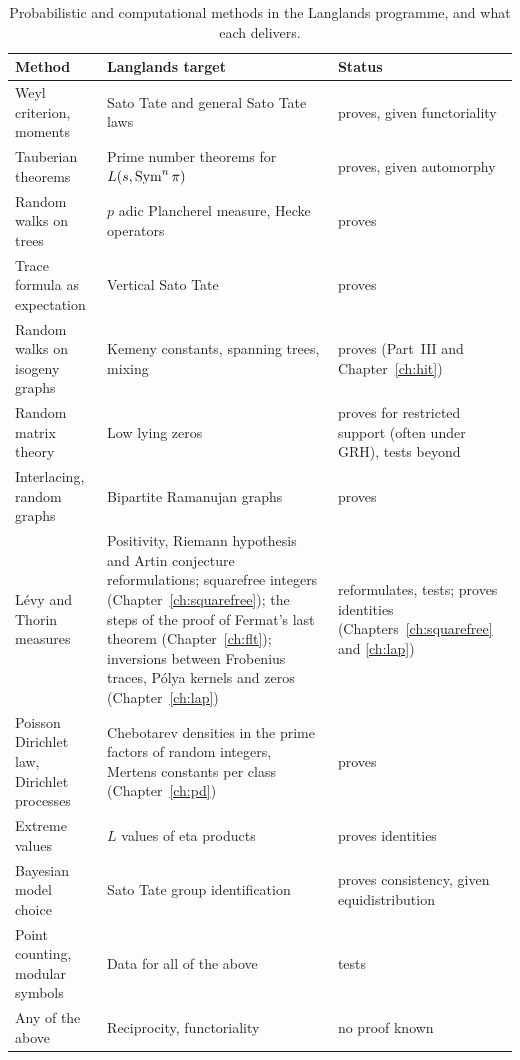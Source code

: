 \begin{table}[t]
\centering\small
\begin{tabular}{p{1.4in}p{1.4in}p{1.3in}}
\toprule
Method & Langlands target & Status\tabularnewline
\midrule
\raggedright Weyl criterion, moments & \raggedright Sato Tate and general Sato Tate laws & \raggedright proves, given functoriality\tabularnewline
\raggedright Tauberian theorems & \raggedright Prime number theorems for $L(s,\operatorname{Sym}^n\pi)$ & \raggedright proves, given automorphy\tabularnewline
\raggedright Random walks on trees & \raggedright $p$ adic Plancherel measure, Hecke operators & \raggedright proves\tabularnewline
\raggedright Trace formula as expectation & \raggedright Vertical Sato Tate \cite{serre1997,cdf1997} & \raggedright proves\tabularnewline
\raggedright Random walks on isogeny graphs & \raggedright Kemeny constants, spanning trees, mixing & \raggedright proves (Part~III and Chapter~\ref{ch:hit})\tabularnewline
\raggedright Random matrix theory & \raggedright Low lying zeros \cite{katzsarnak1999,ils2000} & \raggedright proves for restricted support (often under GRH), tests beyond\tabularnewline
\raggedright Interlacing, random graphs & \raggedright Bipartite Ramanujan graphs \cite{mss2015} & \raggedright proves\tabularnewline
\raggedright L\'evy and Thorin measures & \raggedright Positivity, Riemann hypothesis and Artin conjecture reformulations; squarefree integers (Chapter~\ref{ch:squarefree}); the steps of the proof of Fermat's last theorem (Chapter~\ref{ch:flt}); inversions between Frobenius traces, P\'olya kernels and zeros (Chapter~\ref{ch:lap}) & \raggedright reformulates, tests; proves identities (Chapters~\ref{ch:squarefree} and \ref{ch:lap})\tabularnewline
\raggedright Poisson Dirichlet law, Dirichlet processes & \raggedright Chebotarev densities in the prime factors of random integers, Mertens constants per class (Chapter~\ref{ch:pd}) & \raggedright proves\tabularnewline
\raggedright Extreme values & \raggedright $L$ values of eta products & \raggedright proves identities\tabularnewline
\raggedright Bayesian model choice & \raggedright Sato Tate group identification & \raggedright proves consistency, given equidistribution\tabularnewline
\raggedright Point counting, modular symbols & \raggedright Data for all of the above & \raggedright tests\tabularnewline
\raggedright Any of the above & \raggedright Reciprocity, functoriality & \raggedright no proof known\tabularnewline
\bottomrule
\end{tabular}
\caption{Probabilistic and computational methods in the Langlands programme, and what each delivers.}\label{tab:01map}
\end{table}

